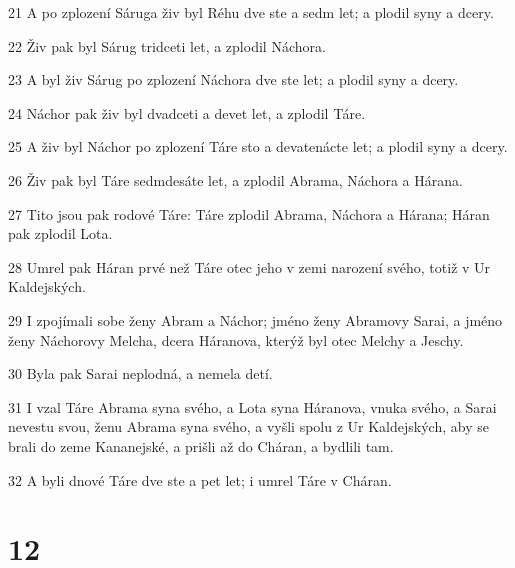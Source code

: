 \par 21 A po zplození Sáruga živ byl Réhu dve ste a sedm let; a plodil syny a dcery.
\par 22 Živ pak byl Sárug tridceti let, a zplodil Náchora.
\par 23 A byl živ Sárug po zplození Náchora dve ste let; a plodil syny a dcery.
\par 24 Náchor pak živ byl dvadceti a devet let, a zplodil Táre.
\par 25 A živ byl Náchor po zplození Táre sto a devatenácte let; a plodil syny a dcery.
\par 26 Živ pak byl Táre sedmdesáte let, a zplodil Abrama, Náchora a Hárana.
\par 27 Tito jsou pak rodové Táre: Táre zplodil Abrama, Náchora a Hárana; Háran pak zplodil Lota.
\par 28 Umrel pak Háran prvé než Táre otec jeho v zemi narození svého, totiž v Ur Kaldejských.
\par 29 I zpojímali sobe ženy Abram a Náchor; jméno ženy Abramovy Sarai, a jméno ženy Náchorovy Melcha, dcera Háranova, kterýž byl otec Melchy a Jeschy.
\par 30 Byla pak Sarai neplodná, a nemela detí.
\par 31 I vzal Táre Abrama syna svého, a Lota syna Háranova, vnuka svého, a Sarai nevestu svou, ženu Abrama syna svého, a vyšli spolu z Ur Kaldejských, aby se brali do zeme Kananejské, a prišli až do Cháran, a bydlili tam.
\par 32 A byli dnové Táre dve ste a pet let; i umrel Táre v Cháran.

\chapter{12}

